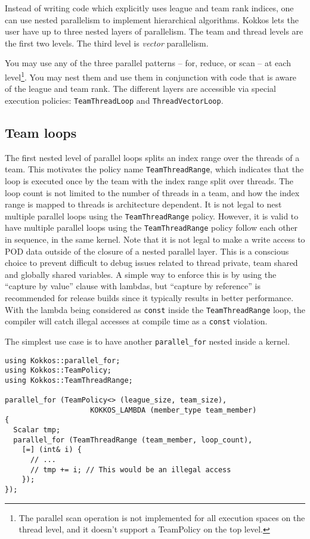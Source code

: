 Instead of writing code which explicitly uses league and team rank indices, one can use nested parallelism to implement hierarchical algorithms.
Kokkos lets the user have up to three nested layers of parallelism.
The team and thread levels are the first two levels.
The third level is \emph{vector} parallelism.

You may use any of the three parallel patterns -- for, reduce, or scan -- at each level\footnote{The parallel scan operation is not implemented for all execution spaces on the thread level, and it doesn't support a TeamPolicy on the top level.}.
You may nest them and use them in conjunction with code that is aware of the league and team rank.
The different layers are accessible via special execution policies:
\lstinline|TeamThreadLoop| and \lstinline|ThreadVectorLoop|. 

\subsection{Team loops}\label{SS:Hierarchical:Nested:Loops:Team}

The first nested level of parallel loops splits an index range over the threads of a team. 
This motivates the policy name \lstinline|TeamThreadRange|, 
which indicates that the loop is executed once by the team with the index range split over threads.
The loop count is not limited to the number of threads in a team, and how the index range is mapped to threads is architecture dependent.
It is not legal to nest multiple parallel loops using the \lstinline!TeamThreadRange! policy.
However, it is valid to have multiple parallel loops using the \lstinline!TeamThreadRange! policy follow each other in sequence, in the same kernel.  
Note that it is not legal to make a write access to POD data outside of the closure of a nested parallel layer. 
This is a conscious choice to prevent difficult to debug issues related to thread private, team shared and globally shared variables. 
A simple way to enforce this is by using the ``capture by value'' clause with lambdas, 
but ``capture by reference'' is recommended for release builds since it typically results in better performance.
With the lambda being considered as \lstinline|const| inside the \lstinline!TeamThreadRange! loop,
the compiler will catch illegal accesses at compile time as a \lstinline|const| violation.  

The simplest use case is to have another \lstinline|parallel_for| nested inside a kernel. 
\begin{lstlisting}
using Kokkos::parallel_for;
using Kokkos::TeamPolicy;
using Kokkos::TeamThreadRange;

parallel_for (TeamPolicy<> (league_size, team_size), 
                    KOKKOS_LAMBDA (member_type team_member)
{
  Scalar tmp;
  parallel_for (TeamThreadRange (team_member, loop_count), 
    [=] (int& i) {
      // ...
      // tmp += i; // This would be an illegal access
    });
});
\end{lstlisting}

